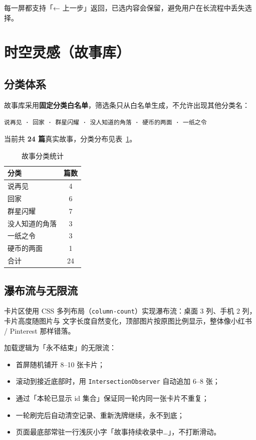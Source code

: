 \documentclass[12pt,a4paper]{ctexart}
\begin{document}
每一屏都支持「← 上一步」返回，已选内容会保留，避免用户在长流程中丢失选择。

\section{时空灵感（故事库）}

\subsection{分类体系}

故事库采用\textbf{固定分类白名单}，筛选条只从白名单生成，不允许出现其他分类名：

\begin{center}
  \texttt{说再见 · 回家 · 群星闪耀 · 没人知道的角落 · 硬币的两面 · 一纸之令}
\end{center}

当前共 \textbf{24 篇}真实故事，分类分布见表~\ref{tab:cats}。

\begin{table}[h]
  \centering
  \begin{tabular}{@{}lc@{}}
    \toprule
    分类 & 篇数 \\
    \midrule
    说再见 & 4 \\
    回家 & 6 \\
    群星闪耀 & 7 \\
    没人知道的角落 & 3 \\
    一纸之令 & 3 \\
    硬币的两面 & 1 \\
    \midrule
    合计 & 24 \\
    \bottomrule
  \end{tabular}
  \caption{故事分类统计}
  \label{tab:cats}
\end{table}

\subsection{瀑布流与无限流}

卡片区使用 CSS 多列布局（\texttt{column-count}）实现瀑布流：桌面 3 列、手机 2 列，卡片高度随图片与
文字长度自然变化，顶部图片按原图比例显示，整体像小红书 / Pinterest 那样错落。

加载逻辑为「永不结束」的无限流：

\begin{itemize}
  \item 首屏随机铺开 8–10 张卡片；
  \item 滚动到接近底部时，用 \texttt{IntersectionObserver} 自动追加 6–8 张；
  \item 通过「本轮已显示 id 集合」保证同一轮内同一张卡片不重复；
  \item 一轮刷完后自动清空记录、重新洗牌继续，永不到底；
  \item 页面最底部常驻一行浅灰小字「故事持续收录中…」，不打断滑动。
\end{itemize}
\end{document}
